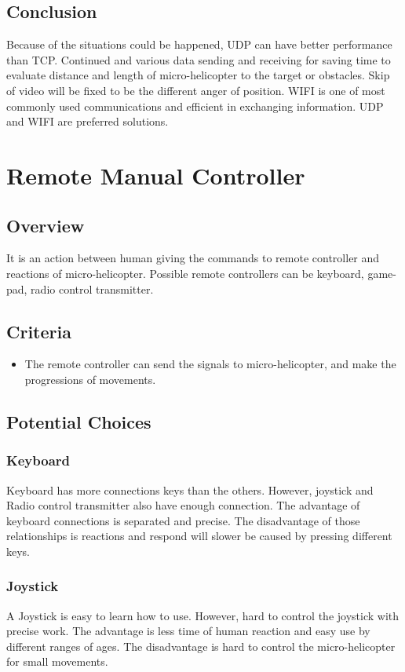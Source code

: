 \documentclass[letterpaper, 10, draftclsnofoot, onecolumn]{IEEEtran}
\begin{document}
\subsection*{Conclusion}\hfill \break
Because of the situations could be happened, UDP can have better performance than TCP. Continued and various data sending and receiving for saving time to evaluate distance and length of micro-helicopter to the target or obstacles. Skip of video will be fixed to be the different anger of position. WIFI is one of most commonly used communications and efficient in exchanging information. UDP and WIFI are preferred solutions. 

\section*{Remote Manual Controller}
\subsection*{Overview}\hfill \break
It is an action between human giving the commands to remote controller and reactions of micro-helicopter. Possible remote controllers can be keyboard, game-pad, radio control transmitter. 
\subsection*{Criteria}\hfill \break
\begin{itemize}
\item The remote controller can send the signals to micro-helicopter, and make the progressions of movements.
\end{itemize}
\subsection*{Potential Choices}
\subsubsection*{Keyboard}\hfill \break
Keyboard has more connections keys than the others. However, joystick and Radio control transmitter also have enough connection. The advantage of keyboard connections is separated and precise. The disadvantage of those relationships is reactions and respond will slower be caused by pressing different keys.
\subsubsection*{Joystick}\hfill \break
A Joystick is easy to learn how to use. However, hard to control the joystick with precise work. The advantage is less time of human reaction and easy use by different ranges of ages. The disadvantage is hard to control the micro-helicopter for small movements.
\end{document}
